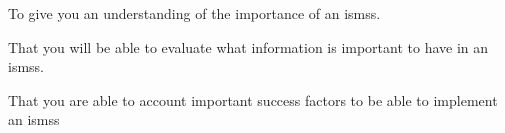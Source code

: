 \item To give you an understanding of the importance of an \acp{isms}.
\item That you will be able to evaluate what information is important to have in
an \acp{isms}\@.
\item That you are able to account important success factors to be able to
implement an \acp{isms}\@
